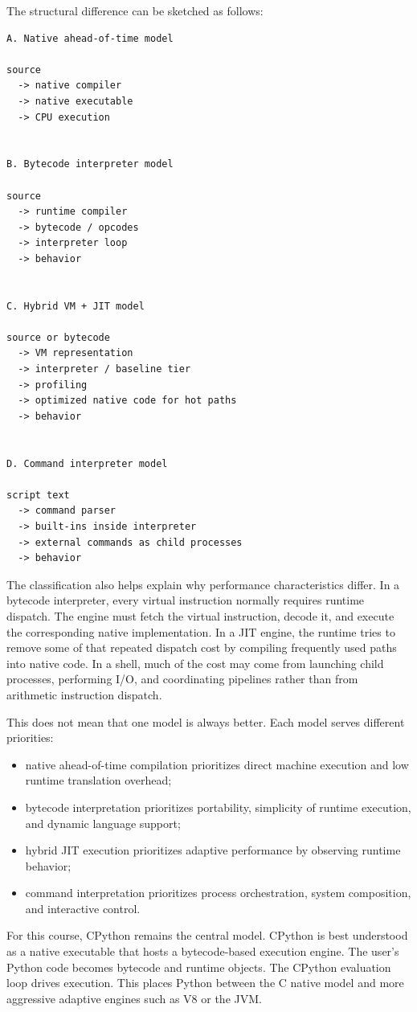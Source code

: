 \documentclass[a4paper,twoside]{report}
\begin{document}
The structural difference can be sketched as follows:

\begin{verbatim}
A. Native ahead-of-time model

source
  -> native compiler
  -> native executable
  -> CPU execution


B. Bytecode interpreter model

source
  -> runtime compiler
  -> bytecode / opcodes
  -> interpreter loop
  -> behavior


C. Hybrid VM + JIT model

source or bytecode
  -> VM representation
  -> interpreter / baseline tier
  -> profiling
  -> optimized native code for hot paths
  -> behavior


D. Command interpreter model

script text
  -> command parser
  -> built-ins inside interpreter
  -> external commands as child processes
  -> behavior
\end{verbatim}

The classification also helps explain why performance characteristics differ. In a bytecode interpreter, every virtual instruction normally requires runtime dispatch. The engine must fetch the virtual instruction, decode it, and execute the corresponding native implementation. In a JIT engine, the runtime tries to remove some of that repeated dispatch cost by compiling frequently used paths into native code. In a shell, much of the cost may come from launching child processes, performing I/O, and coordinating pipelines rather than from arithmetic instruction dispatch.

This does not mean that one model is always better. Each model serves different priorities:

\begin{itemize}
    \item native ahead-of-time compilation prioritizes direct machine execution and low runtime translation overhead;
    \item bytecode interpretation prioritizes portability, simplicity of runtime execution, and dynamic language support;
    \item hybrid JIT execution prioritizes adaptive performance by observing runtime behavior;
    \item command interpretation prioritizes process orchestration, system composition, and interactive control.
\end{itemize}

For this course, CPython remains the central model. CPython is best understood as a native executable that hosts a bytecode-based execution engine. The user's Python code becomes bytecode and runtime objects. The CPython evaluation loop drives execution. This places Python between the C native model and more aggressive adaptive engines such as V8 or the JVM.
\end{document}
